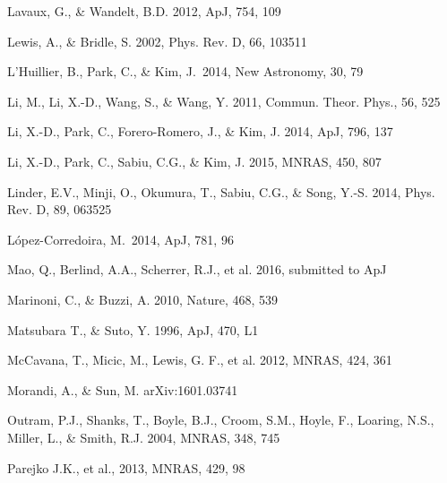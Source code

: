 \documentclass[iop]{emulateapj}
\begin{document}
\begin{thebibliography}{}
Lavaux, G., \& Wandelt, B.D. 2012, ApJ, 754, 109  


Lewis, A., \& Bridle, S. 2002, Phys. Rev. D, 66, 103511

L'Huillier, B., Park, C., \& Kim, J.\ 2014, New Astronomy, 30, 79 

Li, M., Li, X.-D., Wang, S., \& Wang, Y. 2011, Commun. Theor. Phys., 56, 525

Li, X.-D., Park, C., Forero-Romero, J., \& Kim, J. 2014, ApJ, 796, 137

Li, X.-D., Park, C., Sabiu, C.G., \& Kim, J. 2015, MNRAS, 450, 807 


Linder, E.V., Minji, O., Okumura, T., Sabiu, C.G., \& Song, Y.-S. 2014, Phys. Rev. D, 89, 063525  

L{\'o}pez-Corredoira, M.\ 2014, ApJ, 781, 96 

Mao, Q., Berlind, A.A., Scherrer, R.J., et al. 2016, submitted to ApJ

Marinoni, C., \& Buzzi, A. 2010, Nature, 468, 539  

Matsubara T., \& Suto, Y. 1996, ApJ, 470, L1  

McCavana, T., Micic, M., Lewis, G. F., et al. 2012, MNRAS, 424, 361


Morandi, A., \& Sun, M. arXiv:1601.03741


Outram, P.J., Shanks, T., Boyle, B.J., Croom, S.M., Hoyle, F., Loaring, N.S., 
Miller, L., \& Smith, R.J. 2004, MNRAS, 348, 745  


Parejko J.K., et al., 2013, MNRAS, 429, 98


\end{thebibliography}
\end{document}
